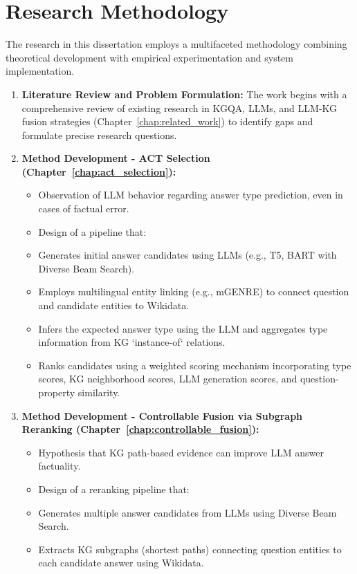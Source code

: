 \section{Research Methodology}
\label{sec:intro:methodology}
The research in this dissertation employs a multifaceted methodology combining theoretical development with empirical experimentation and system implementation.
\begin{enumerate}
    \item \textbf{Literature Review and Problem Formulation:} The work begins with a comprehensive review of existing research in KGQA, LLMs, and LLM-KG fusion strategies (Chapter~\ref{chap:related_work}) to identify gaps and formulate precise research questions.
    \item \textbf{Method Development - ACT Selection (Chapter~\ref{chap:act_selection}):}
    \begin{itemize}
        \item Observation of LLM behavior regarding answer type prediction, even in cases of factual error.
        \item Design of a pipeline that:
            \item Generates initial answer candidates using LLMs (e.g., T5, BART with Diverse Beam Search).
            \item Employs multilingual entity linking (e.g., mGENRE) to connect question and candidate entities to Wikidata.
            \item Infers the expected answer type using the LLM and aggregates type information from KG `instance-of` relations.
            \item Ranks candidates using a weighted scoring mechanism incorporating type scores, KG neighborhood scores, LLM generation scores, and question-property similarity.
    \end{itemize}
    \item \textbf{Method Development - Controllable Fusion via Subgraph Reranking (Chapter~\ref{chap:controllable_fusion}):}
    \begin{itemize}
        \item Hypothesis that KG path-based evidence can improve LLM answer factuality.
        \item Design of a reranking pipeline that:
            \item Generates multiple answer candidates from LLMs using Diverse Beam Search.
            \item Extracts KG subgraphs (shortest paths) connecting question entities to each candidate answer using Wikidata.

\end{itemize}
\end{enumerate}
